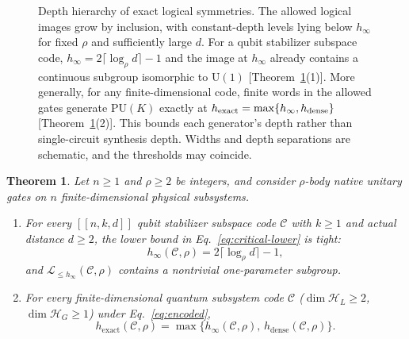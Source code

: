 \documentclass[aps,prl,reprint,notitlepage,nofootinbib,nobibnotes]{revtex4-2}
\newtheorem{theorem}{Theorem}
\newcommand{\HH}{\mathcal H}
\newcommand{\UU}{\mathrm U}
\newcommand{\PU}{\mathrm{PU}}
\begin{document}
\begin{figure}[htb]
{%
}
\caption{Depth hierarchy of exact logical symmetries. The allowed logical images grow by inclusion, with constant-depth levels lying below \(h_\infty\) for fixed \(\rho\) and sufficiently large \(d\). For a qubit stabilizer subspace code, \(h_\infty=2\lceil\log_\rho d\rceil-1\) and the image at \(h_\infty\) already contains a continuous subgroup isomorphic to \(\UU(1)\) [Theorem~\ref{cor:critical}(1)]. More generally, for any finite-dimensional code, finite words in the allowed gates generate \(\PU(K)\) exactly at \(h_{\rm exact}=\max\{h_\infty,h_{\rm dense}\}\) [Theorem~\ref{cor:critical}(2)]. This bounds each generator's depth rather than single-circuit synthesis depth. Widths and depth separations are schematic, and the thresholds may coincide.}
\label{fig:logical-hierarchy}
\end{figure}

\begin{theorem}\label{cor:critical}
Let \(n\ge1\) and \(\rho\ge2\) be integers, and consider \(\rho\)-body native unitary gates on \(n\) finite-dimensional physical subsystems.
\begin{enumerate}
\item[(1)] For every \([[n,k,d]]\) qubit stabilizer subspace code \(\mathcal C\) with \(k\ge1\) and actual distance \(d\ge2\), the lower bound in Eq.~\eqref{eq:critical-lower} is tight:
\begin{equation}\label{eq:critical}
 h_\infty(\mathcal C,\rho)=2\lceil\log_\rho d\rceil-1,
\end{equation}
and \(\mathcal L_{\le h_\infty}(\mathcal C,\rho)\) contains a nontrivial one-parameter subgroup.
\item[(2)] For every finite-dimensional quantum subsystem code \(\mathcal C\) (\(\dim\HH_L\ge2\), \(\dim\HH_G\ge1\)) under Eq.~\eqref{eq:encoded},
\begin{equation}\label{eq:exact-max}
 h_{\mathrm{exact}}(\mathcal C,\rho)
 =\max\{h_\infty(\mathcal C,\rho),\,h_{\mathrm{dense}}(\mathcal C,\rho)\}.
\end{equation}
\end{enumerate}
\end{theorem}
\end{document}
